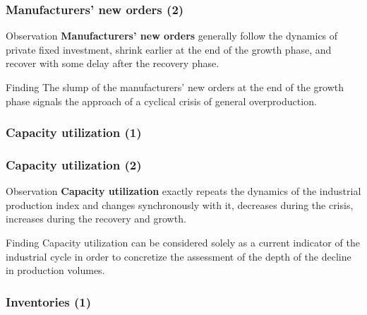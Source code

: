 \begin{frame}
  \frametitle{Manufacturers' new orders (2)}
  \begin{block}{Observation}
    \textbf{Manufacturers' new orders} generally follow the dynamics of private fixed investment, shrink earlier at the end of the growth phase, and recover with some delay after the recovery phase.
  \end{block}

  \begin{alertblock}{Finding}
    The slump of the manufacturers' new orders at the end of the growth phase signals the approach of a cyclical crisis of general overproduction.
  \end{alertblock}
\end{frame}

\begin{frame}
  \frametitle{Capacity utilization (1)}
  \begin{center}
  \end{center}
\end{frame}

\begin{frame}
  \frametitle{Capacity utilization (2)}
  \begin{block}{Observation}
    \textbf{Capacity utilization} exactly repeats the dynamics of the industrial production index and changes synchronously with it, decreases during the crisis, increases during the recovery and growth.
  \end{block}

  \begin{alertblock}{Finding}
    Capacity utilization can be considered solely as a current indicator of the industrial cycle in order to concretize the assessment of the depth of the decline in production volumes.
  \end{alertblock}
\end{frame}

\begin{frame}
  \frametitle{Inventories (1)}
  \begin{center}
  \end{center}
\end{frame}

